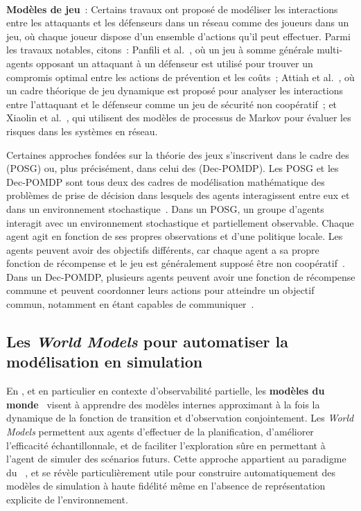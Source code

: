 \

\noindent
\textbf{Modèles de jeu}~: \quad Certains travaux ont proposé de modéliser les interactions entre les attaquants et les défenseurs dans un réseau comme des joueurs dans un jeu, où chaque joueur dispose d'un ensemble d'actions qu'il peut effectuer.
Parmi les travaux notables, citons~: Panfili et al.~\cite{MPanfili2018}, où un jeu à somme générale multi-agents opposant un attaquant à un défenseur est utilisé pour trouver un compromis optimal entre les actions de prévention et les coûts~; Attiah et al.~\cite{AAttiah2018}, où un cadre théorique de jeu dynamique est proposé pour analyser les interactions entre l'attaquant et le défenseur comme un jeu de sécurité non coopératif~; et Xiaolin et al.~\cite{CXiaolin2008}, qui utilisent des modèles de processus de Markov pour évaluer les risques dans les systèmes en réseau.

\noindent
Certaines approches fondées sur la théorie des jeux s'inscrivent dans le cadre des  (POSG) ou, plus précisément, dans celui des  (Dec-POMDP). Les POSG et les Dec-POMDP sont tous deux des cadres de modélisation mathématique des problèmes de prise de décision dans lesquels des agents interagissent entre eux et dans un environnement stochastique~\cite{beynier2010}. Dans un POSG, un groupe d'agents interagit avec un environnement stochastique et partiellement observable. Chaque agent agit en fonction de ses propres observations et d'une politique locale. Les agents peuvent avoir des objectifs différents, car chaque agent a sa propre fonction de récompense et le jeu est généralement supposé être non coopératif~\cite{terry2020pettingzoo}. Dans un Dec-POMDP, plusieurs agents peuvent avoir une fonction de récompense commune et peuvent coordonner leurs actions pour atteindre un objectif commun, notamment en étant capables de communiquer~\cite{bernstein2013}.


\subsection{Les \textit{World Models} pour automatiser la modélisation en simulation}

En , et en particulier en contexte d'observabilité partielle, les \textbf{modèles du monde}~\cite{ha2018recurrent, hafner2020dream} visent à apprendre des modèles internes approximant à la fois la dynamique de la fonction de transition et d'observation conjointement. Les \textit{World Models} permettent aux agents d'effectuer de la planification, d'améliorer l'efficacité échantillonnale, et de faciliter l'exploration sûre en permettant à l'agent de simuler des scénarios futurs. Cette approche appartient au paradigme du ~\cite{moerland2020model}, et se révèle particulièrement utile pour construire automatiquement des modèles de simulation à haute fidélité même en l'absence de représentation explicite de l'environnement.

